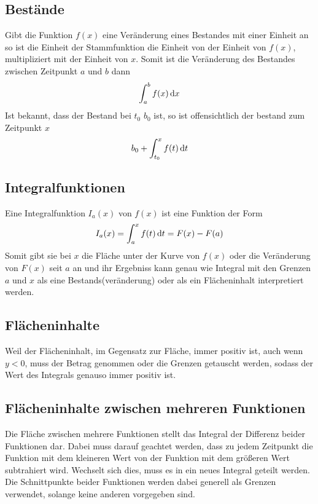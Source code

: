 \documentclass{article}
\begin{document}
\subsection{Bestände} 
Gibt die Funktion $f(x)$ eine Veränderung eines Bestandes mit einer Einheit an so ist die Einheit der Stammfunktion die Einheit von der Einheit von $f(x)$, multipliziert mit der Einheit von $x$. Somit ist die Veränderung des Bestandes zwischen Zeitpunkt $a$ und $b$ dann
\[
 \int_a^b f(x) \,\mathrm{d}{x}
\]
Ist bekannt, dass der Bestand bei $t_0$ $b_0$ ist, so ist offensichtlich der bestand zum Zeitpunkt $x$
\[
 b_0 + \int_{t_0}^x f(t) \,\mathrm{d}{t}
\]
 
\subsection{Integralfunktionen} 
Eine Integralfunktion $I_a(x)$ von $f(x)$ ist eine Funktion der Form
\[
 I_a(x) = \int_a^x f(t) \,\mathrm{d}{t} = F(x) - F(a)
\]
Somit gibt sie bei $x$ die Fläche unter der Kurve von $f(x)$ oder die Veränderung von $F(x)$ seit $a$ an und ihr Ergebniss kann genau wie Integral mit den Grenzen $a$ und $x$ als eine Bestands(veränderung) oder als ein Flächeninhalt interpretiert werden.
 
\subsection{Flächeninhalte}
Weil der Flächeninhalt, im Gegensatz zur Fläche, immer positiv ist, auch wenn $y<0$, muss der Betrag genommen oder die Grenzen getauscht werden, sodass der Wert des Integrals genauso immer positiv ist. 
 
\subsection{Flächeninhalte zwischen mehreren Funktionen}
Die Fläche zwischen mehrere Funktionen stellt das Integral der Differenz beider Funktionen dar. Dabei muss darauf geachtet werden, dass zu jedem Zeitpunkt die Funktion mit dem kleineren Wert von der Funktion mit dem größeren Wert subtrahiert wird. Wechselt sich dies, muss es in ein neues Integral geteilt werden. Die Schnittpunkte beider Funktionen werden dabei generell als Grenzen verwendet, solange keine anderen vorgegeben sind. 
 
\end{document}
